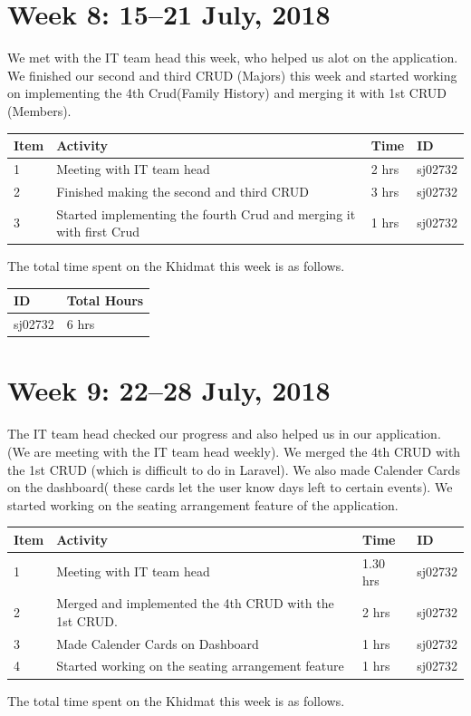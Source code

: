 \documentclass{article}
\begin{document}
\newpage %
\section*{Week 8: 15--21 July, 2018}

We met with the IT team head this week, who helped us alot on the application. We finished our second and third CRUD (Majors) this week and started working on implementing the 4th Crud(Family History) and merging it with 1st CRUD (Members). \newline

\begin{tabular}{|l|l|l|l|}
  \hline
  Item 	& Activity & Time & ID \\\hline\hline
  1	& Meeting with IT team head & 2 hrs & sj02732 \\\hline
  2	& Finished making the second and third CRUD  & 3 hrs & sj02732 \\\hline
  3	& Started implementing the fourth Crud and merging it with first Crud & 1 hrs & sj02732 \\\hline
\end{tabular}
\newline
The total time spent on the Khidmat this week is as follows.

\begin{tabular}{|l|l|}
  \hline
  ID & Total Hours\\\hline\hline
  sj02732 & 6 hrs\\\hline
\end{tabular}

\newpage %
\section*{Week 9: 22--28 July, 2018}

The IT team head checked our progress and also helped us in our application. (We are meeting with the IT team head weekly). We merged the 4th CRUD with the 1st CRUD (which is difficult to do in Laravel). We also made Calender Cards on the dashboard( these cards let the user know days left to certain events). We started working on the seating arrangement feature of the application. \newline

\begin{tabular}{|l|l|l|l|}
  \hline
  Item 	& Activity & Time & ID \\\hline\hline
  1	& Meeting with IT team head & 1.30 hrs & sj02732 \\\hline
  2	& Merged and implemented the 4th CRUD with the 1st CRUD. & 2 hrs & sj02732 \\\hline
  3	& Made Calender Cards on Dashboard & 1 hrs & sj02732 \\\hline
  4	& Started working on the seating arrangement feature  & 1 hrs & sj02732 \\\hline
\end{tabular}
\newline
The total time spent on the Khidmat this week is as follows.
\end{document}

